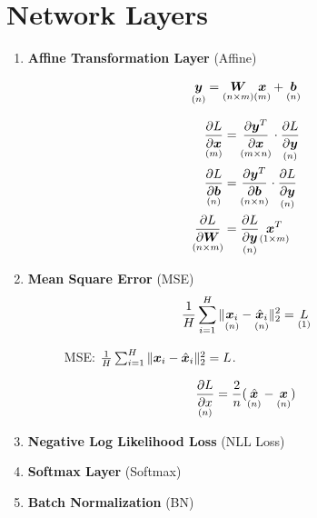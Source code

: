 \documentclass[9pt,twocolumn,times]{article}
\begin{document}
\section{Network Layers}

\begin{enumerate}[leftmargin=*]
\item \textbf{Affine Transformation Layer} (Affine)

\begin{align}
	\underset{(n)}{{\bm{y}}} = \underset{(n\times m)}{{\bm{W}}}
		\underset{(m)}{{\bm{x}}} + \underset{(n)}{{\bm{b}}}
\end{align}

\begin{align}
	\underset{(m)}{\frac{\partial L}{\partial {\bm{x}}}} &=
	\underset{(m\times n)}{\frac{\partial {\bm{y}}^T}{\partial {\bm{x}}}} \cdot
	\underset{(n)}{\frac{\partial L}{\partial {\bm{y}}}} \\
	\underset{(n)}{\frac{\partial L}{\partial {\bm{b}}}} &=
	\underset{(n\times n)}{\frac{\partial {\bm{y}}^T}{\partial {\bm{b}}}} \cdot
	\underset{(n)}{\frac{\partial L}{\partial {\bm{y}}}} \\
	\underset{(n\times m)}{\frac{\partial L}{\partial {\bm{W}}}} &=
	\underset{(n)}{\frac{\partial L}{\partial {\bm{y}}}}
	\underset{(1\times m)}{{\bm{x}}^T}
\end{align}

\item \textbf{Mean Square Error} (MSE)
\begin{equation}
	\frac{1}{H} \sum_{i=1}^H
	\|\underset{(n)}{{\bm{x}}_i} - \underset{(n)}{\hat{{\bm{x}}}_i} \|_2^2
	= \underset{(1)}{L} 
\end{equation}
\begin{figure}[h]
	\centering
	\resizebox{0.618\columnwidth}{!}{%
		
	}
	\caption{MSE: $\frac{1}{H} \sum_{i=1}^H \|{\bm{x}}_i - \hat{{\bm{x}}}_i\|_2^2 = L$.}
\end{figure}

\begin{equation}
	\underset{(n)}{\frac{\partial L}{\partial x}} =
	\frac{2}{n}(
	\underset{(n)}{\hat{{\bm{x}}}} - \underset{(n)}{{\bm{x}}} )
\end{equation}

\item \textbf{Negative Log Likelihood Loss} (NLL Loss)

\item \textbf{Softmax Layer} (Softmax)

\item \textbf{Batch Normalization} (BN)
\end{enumerate}
\end{document}
